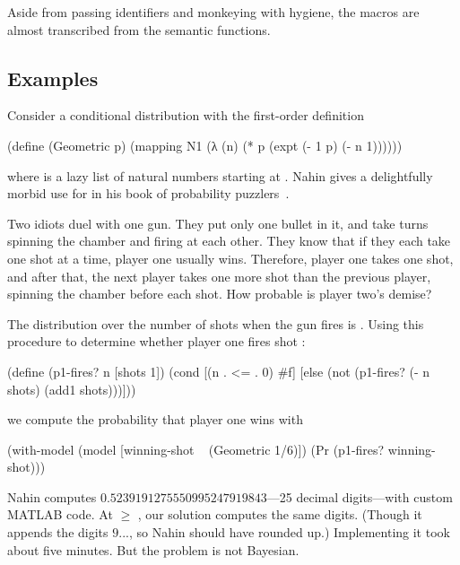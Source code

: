 Aside from passing identifiers and monkeying with hygiene, the macros are almost transcribed from the semantic functions.

\subsection{Examples}

Consider a conditional distribution with the first-order definition
\begin{center}
\singlespacing
\begin{schemedisplay}
(define (Geometric p)
  (mapping N1 (λ (n) (* p (expt (- 1 p) (- n 1))))))
\end{schemedisplay}
\end{center}
where  is a lazy list of natural numbers starting at . Nahin gives a delightfully morbid use for  in his book of probability puzzlers~\cite{cit:nahin-book}.

Two idiots duel with one gun. They put only one bullet in it, and take turns spinning the chamber and firing at each other. They know that if they each take one shot at a time, player one usually wins. Therefore, player one takes one shot, and after that, the next player takes one more shot than the previous player, spinning the chamber before each shot. How probable is player two's demise?

The distribution over the number of shots when the gun fires is . Using this procedure to determine whether player one fires shot :
\begin{center}
\singlespacing
\begin{schemedisplay}
(define (p1-fires? n [shots 1])
  (cond [(n . <= . 0)  #f]
        [else  (not (p1-fires? (- n shots) (add1 shots)))]))
\end{schemedisplay}
\end{center}
we compute the probability that player one wins with
\begin{center}
\singlespacing
\begin{schemedisplay}
(with-model (model [winning-shot ~ (Geometric 1/6)])
  (Pr (p1-fires? winning-shot)))
\end{schemedisplay}
\end{center}
Nahin computes $0.5239191275550995247919843$---25 decimal digits---with custom MATLAB code. At  $\ge$ , our solution computes the same digits. (Though it appends the digits $9...$, so Nahin should have rounded up.) Implementing it took about five minutes. But the problem is not Bayesian.

